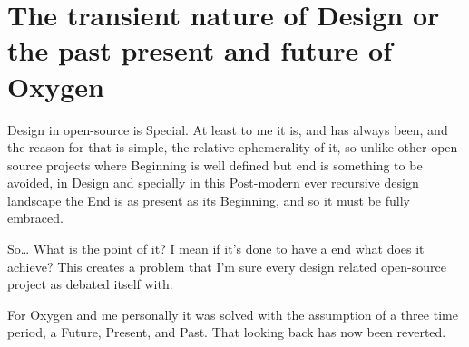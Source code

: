 

\section*{The transient nature of Design or the past present and future of Oxygen}
Design in open-source is Special. At least to me it is, and has always been, and the reason for that is simple, the relative ephemerality of it, so unlike other open-source projects where Beginning is well defined but end is something to be avoided, in Design and specially in this Post-modern ever recursive design landscape the End is as present as its Beginning, and so it must be fully embraced.


So… What is the point of it? I mean if it's done to have a end what does it achieve? This creates a problem that I'm sure every design related open-source project as debated itself with.

For Oxygen and me personally it was solved with the assumption of a three time period, a Future, Present, and Past.  That looking back has now been reverted. 

